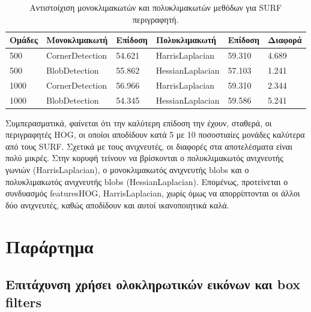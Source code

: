\documentclass{article}
\newcommand{\eng}[1]{\foreignlanguage{english}{#1}}
\begin{document}
\begin{table}[htbp]
  \centering
  \caption{Αντιστοίχιση μονοκλιμακωτών και πολυκλιμακωτών μεθόδων για \eng{SURF} περιγραφητή.}
    \begin{tabular}{|l|l|l|l|l|l|}
    \toprule
    Ομάδες & Μονοκλιμακωτή & Επίδοση & Πολυκλιμακωτή & Επίδοση & Διαφορά\\
    \midrule
    500 & \eng{CornerDetection} & 54.621 & \eng{HarrisLaplacian} & 59.310 & 4.689 \\
    500 & \eng{BlobDetection} & 55.862 & \eng{HessianLaplacian} & 57.103 & 1.241\\
    1000 & \eng{CornerDetection} & 56.966 & \eng{HarrisLaplacian} & 59.310 & 2.344\\
    1000 & \eng{BlobDetection} & 54.345 & \eng{HessianLaplacian} & 59.586 & 5.241\\
    \bottomrule
    \end{tabular}%
  \label{tab:mytable}%
\end{table}%

Συμπερασματικά, φαίνεται ότι την καλύτερη επίδοση την έχουν, σταθερά, οι περιγραφητές \eng{HOG}, οι οποίοι αποδίδουν κατά 5 με 10 ποσοστιαίες μονάδες καλύτερα από τους \eng{SURF}. Σχετικά με τους ανιχνευτές, οι διαφορές στα αποτελέσματα είναι πολύ μικρές.  Στην κορυφή τείνουν να βρίσκονται ο πολυκλιμακωτός ανιχνευτής γωνιών (\eng{HarrisLaplacian}), ο μονοκλιμακωτός ανιχνευτής \eng{blobs} και ο πολυκλιμακωτός ανιχνευτής \eng{blobs} (\eng{HessianLaplacian}). Επομένως, προτείνεται ο συνδυασμός \eng{featuresHOG, HarrisLaplacian}, χωρίς όμως να απορρίπτονται οι άλλοι δύο ανιχνευτές, καθώς αποδίδουν και αυτοί ικανοποιητικά καλά. 

\newpage
\section{Παράρτημα}
\subsection{Επιτάχυνση χρήσει ολοκληρωτικών εικόνων και \eng{box filters}}
\label{section:details}
\end{document}
